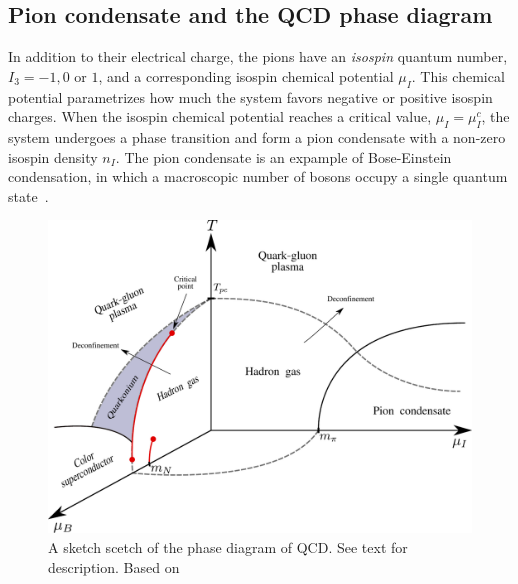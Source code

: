 \subsection*{Pion condensate and the QCD phase diagram}

In addition to their electrical charge, the pions have an \emph{isospin} quantum number, $I_3 = -1, 0$ or $1$, and a corresponding isospin chemical potential $\mu_I$.
This chemical potential parametrizes how much the system favors negative or positive isospin charges.
When the isospin chemical potential reaches a critical value, $\mu_I = \mu_I^c$, the system undergoes a phase transition and form a pion condensate with a non-zero isospin density $n_I$.
The pion condensate is an expample of Bose-Einstein condensation, in which a macroscopic number of bosons occupy a single quantum state~\cite{Brandt:QCD_phase_diagram_with_isospin_chemical_potential,Brandt:QCD_phase_diagram_for_nonzero_isospin-asymmetry,mannarelli:meson_condensation}.

\begin{figure}[ht]
    \centering
    \includegraphics[width=\textwidth]{figurer/phase_diagram2.pdf}
    \caption{A sketch scetch of the phase diagram of QCD. See text for description. Based on~\cite{from_hadrons_to_quarks,
            Brandt:QCD_phase_diagram_with_isospin_chemical_potential,Brandt:QCD_phase_diagram_for_nonzero_isospin-asymmetry,Fukushima:The_phase_diagram_of_dense_QCD,mannarelli:meson_condensation,alford:color_superconductivity}
    }
    \label{fig:phase diag qcd}
\end{figure}

